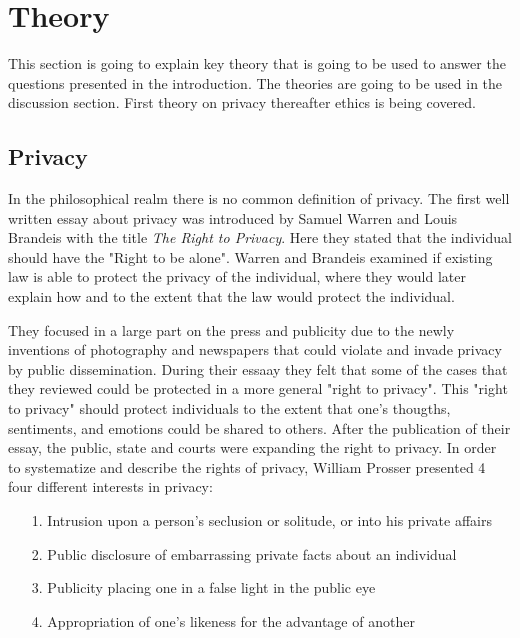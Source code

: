 \section{Theory}
This section is going to explain key theory that is going to be used to answer the questions presented in the introduction. The theories are going to be used in the discussion section. First theory on privacy thereafter ethics is being covered. 

\subsection{Privacy}
In the philosophical realm there is no common definition of privacy. 
The first well written essay about privacy was introduced by Samuel Warren and Louis Brandeis with the title \textit{The Right to Privacy}. Here they stated that the individual should have the "Right to be alone". Warren and Brandeis examined if existing law is able to protect the privacy of the individual, where they would later explain how and to the extent that the law would protect the individual. 

They focused in a large part on the press and publicity due to the newly inventions of photography and newspapers that could violate and invade privacy by public dissemination. During their essaay they felt that some of the cases that they reviewed could be protected in a more general "right to privacy". This "right to privacy" should protect individuals to the extent that one's thougths, sentiments, and emotions could be shared to others. After the publication of their essay, the public, state and courts were expanding the right to privacy. In order to systematize and describe the rights of privacy, William Prosser presented 4 four different interests in privacy:
\begin{itemize}
    \item[1.] Intrusion upon a person's seclusion or solitude, or into his private affairs
    \item[2.] Public disclosure of embarrassing private facts about an individual 
    \item[3.] Publicity placing one in a false light in the public eye
    \item[4.] Appropriation of one's likeness for the advantage of another  
\end{itemize}

